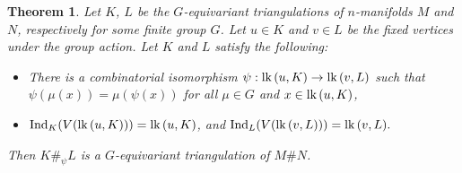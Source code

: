 \documentclass[11pt]{amsart}
\numberwithin{equation}{section}
\newtheorem{theorem}{Theorem}[section]
\theoremstyle{definition}
\newcommand{\lk}{\mbox{\upshape lk}\,}
\begin{document}
\begin{theorem}\label{connectedsum}
    Let $K$, $L$ be the $G$-equivariant triangulations of $n$-manifolds $M$ and $N$, respectively for some finite group $G$. Let $u\in K$ and $v\in L$ be the fixed vertices under the group action. Let $K$ and $L$ satisfy the following:
\begin{itemize}
    \item There is a combinatorial isomorphism $\psi:\lk(u,K)\rightarrow \lk(v,L)$ such that $\psi(\mu(x))=\mu(\psi(x))$ for all $\mu\in G$ and $x\in \lk(u,K)$,
    
    \item $\mathrm{Ind}_K(V(\lk(u,K)))=\lk(u,K)$, and  $\mathrm{Ind}_L(V(\lk(v,L)))=\lk(v,L).$  
\end{itemize}
Then $K\#_{\psi}L$ is a $G$-equivariant triangulation of $M\#N$.
  
\end{theorem}  
\end{document}
